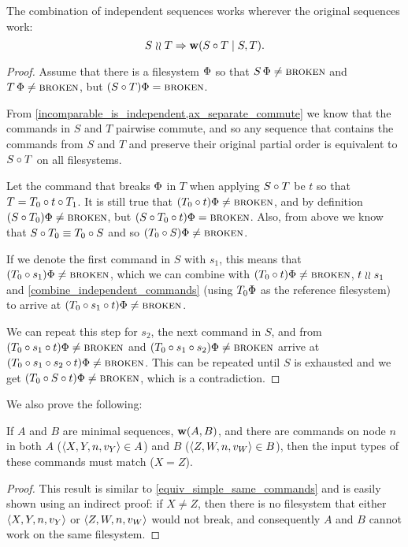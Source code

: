 \begin{mylem}\label{combine_independent_sequences}
The combination of independent sequences works wherever the original sequences work:
\[ S\mathrel{\wr\wr} T \Rightarrow \mathbf{w}({S\circ T}\mathrel{|}{S,T}). \]
\end{mylem}
\begin{proof}
Assume that there is a filesystem $\Phi$ so that
$S\,\Phi\neq\text{\normalfont\scshape{broken}}$ and $T\,\Phi\neq\text{\normalfont\scshape{broken}}$, but
$(S\circ T)\Phi=\text{\normalfont\scshape{broken}}$.

From \cref{incomparable_is_independent,ax_separate_commute} we know that
the commands in $S$ and $T$ pairwise commute, and so any sequence
that contains the commands from $S$ and $T$ and preserve their original partial order
is equivalent to $S\circ T$ on all filesystems.

Let the command that breaks $\Phi$ in $T$ when applying $S\circ T$ be $t$
so that $T=T_0\circ t\circ T_1$.
It is still true that $(T_0 \circ t)\Phi\neq\text{\normalfont\scshape{broken}}$,
and by definition $(S\circ T_0)\Phi\neq\text{\normalfont\scshape{broken}}$,
but $(S\circ T_0\circ t)\Phi=\text{\normalfont\scshape{broken}}$.
Also, from above we know that $S\circ T_0\equiv T_0\circ S$
and so $(T_0 \circ S)\Phi\neq\text{\normalfont\scshape{broken}}$.

If we denote the first command in $S$ with $s_1$,
this means that $(T_0 \circ s_1)\Phi\neq\text{\normalfont\scshape{broken}}$,
which we can combine with $(T_0 \circ t)\Phi\neq\text{\normalfont\scshape{broken}}$, $t\mathrel{\wr\wr} s_1$ and
\cref{combine_independent_commands}
(using $T_0\Phi$ as the reference filesystem)
to arrive at $(T_0 \circ s_1\circ t)\Phi\neq\text{\normalfont\scshape{broken}}$.

We can repeat this step for $s_2$, the next command in $S$,
and from 
$(T_0 \circ s_1\circ t)\Phi\neq\text{\normalfont\scshape{broken}}$
and
$(T_0 \circ s_1\circ s_2)\Phi\neq\text{\normalfont\scshape{broken}}$
arrive at
$(T_0 \circ s_1\circ s_2\circ t)\Phi\neq\text{\normalfont\scshape{broken}}$.
This can be repeated until $S$ is exhausted and we get
$(T_0 \circ S\circ t)\Phi\neq\text{\normalfont\scshape{broken}}$, which is a contradiction.
\end{proof}

We also prove the following:

\begin{mylem}\label{worksinputmatch}
If $A$ and $B$ are minimal sequences, $\mathbf{w}({A,B})$,
and there are commands on node $n$ in both $A$ ($\langle{X,Y,n,v_Y}\rangle\in A$) and $B$ ($\langle{Z,W,n,v_W}\rangle\in B$),
then the input types of these commands must match ($X=Z$).
\end{mylem}
\begin{proof}
This result is similar to \cref{equiv_simple_same_commands} and
is easily shown using an indirect proof: if $X\neq Z$, then there is no filesystem that
either $\langle{X,Y,n,v_Y}\rangle$ or $\langle{Z,W,n,v_W}\rangle$ would not break, 
and consequently $A$ and $B$ cannot work on the same filesystem.
\end{proof}


